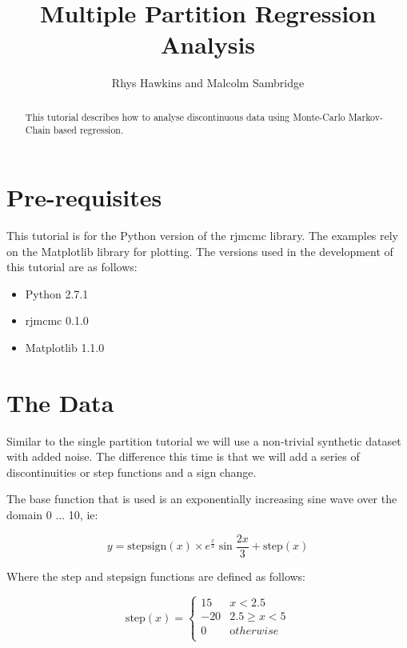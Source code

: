 \documentclass{tufte-handout}
\title{Multiple Partition Regression Analysis}
\author{Rhys Hawkins and Malcolm Sambridge}
\begin{document}
\maketitle

\begin{abstract}

This tutorial describes how to analyse discontinuous data using Monte-Carlo
Markov-Chain based regression.

\end{abstract}

\section{Pre-requisites}

This tutorial is for the Python version of the rjmcmc library. The examples
rely on the Matplotlib library for plotting. The versions used in the 
development of this tutorial are as follows:

\begin{itemize}
\item Python 2.7.1
\item rjmcmc 0.1.0
\item Matplotlib 1.1.0
\end{itemize}

\section{The Data}

Similar to the single partition tutorial we will use a non-trivial 
synthetic dataset with added noise. The difference this time is that 
we will add a series of discontinuities or step functions and a sign
change.

The base function that is used is an exponentially increasing sine wave over 
the domain 0 $\ldots$ 10, ie:

\begin{equation}
y = \mathrm{stepsign}(x) \times e^\frac{x}{3} \sin{ \frac{2x}{3}} + \mathrm{step}(x)
\end{equation}

Where the $\mathrm{step}$ and $\mathrm{stepsign}$ functions are
defined as follows:

\begin{equation}
\mathrm{step}(x) = \left\{ \begin{array}{rl}
15 & x < 2.5 \\
-20 & 2.5 \ge x < 5 \\
0 & {\mathrm otherwise} \\
\end{array}
\right.
\end{equation}
\end{document}
